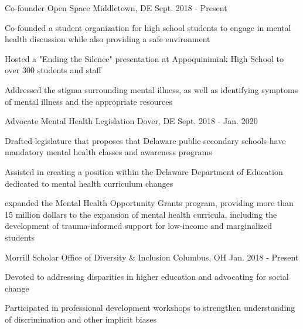 \begin{cventries}
  \cventry
    {Co-founder} %
    {Open Space} %
    {Middletown, DE} %
    {Sept. 2018 - Present} %
    {
      \begin{cvitems} %
        \item {Co-founded a student organization for high school students to engage in mental health discussion while also providing a safe environment}
        \item {Hosted a "Ending the Silence" presentation at Appoquinimink High School to over 300 students and staff}
        \item{Addressed the stigma surrounding mental illness, as well as identifying symptoms of mental illness and the appropriate resources}
      \end{cvitems}
    }

  \cventry
    {Advocate} %
    {Mental Health Legislation} %
    {Dover, DE} %
    {Sept. 2018 - Jan. 2020} %
    {
      \begin{cvitems} %
        \item {Drafted legislature that proposes that Delaware public secondary schools have mandatory mental health classes and awareness programs}
        \item {Assisted in creating a position within the Delaware Department of Education dedicated to mental health
curriculum changes}
        \item{expanded the Mental Health Opportunity Grants program, providing more than 15 million dollars to the expansion of mental health curricula, including the development of trauma-informed support for low-income and marginalized students}
      \end{cvitems}
    }


  \cventry
    {Morrill Scholar} %
    {Office of Diversity \& Inclusion} %
    {Columbus, OH} %
    {Jan. 2018 - Present} %
    {
      \begin{cvitems} %
        \item {Devoted to addressing disparities in higher education and advocating for social change}
        \item {Participated in professional development workshops to strengthen understanding of discrimination and
other implicit biases}
      \end{cvitems}
    }
\end{cventries}
